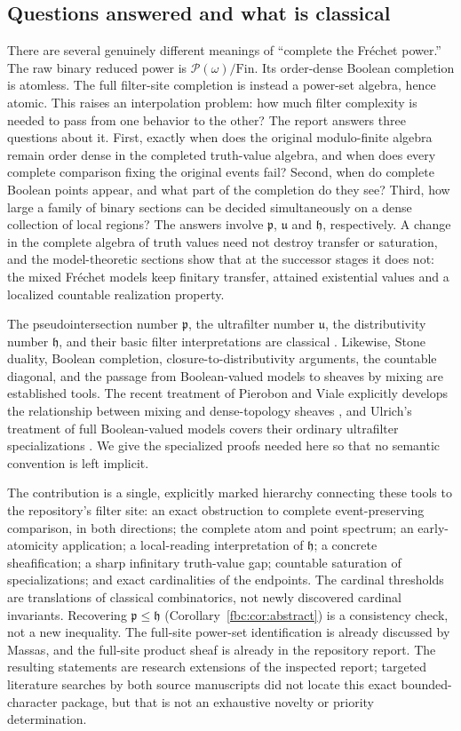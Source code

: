 \documentclass[11pt,letterpaper]{article}
\theoremstyle{definition}
\theoremstyle{remark}
\newcommand{\om}{\omega}
\newcommand{\Fin}{\mathrm{Fin}}
\newcommand{\pow}{\mathcal P}
\newcommand{\cp}{\mathfrak p}
\newcommand{\cu}{\mathfrak u}
\newcommand{\ch}{\mathfrak h}
\begin{document}
\subsection{Questions answered and what is classical}
There are several genuinely different meanings of ``complete the
Fr\'echet power.'' The raw binary reduced power is $\pow(\om)/\Fin$. Its
order-dense Boolean completion is atomless. The full filter-site
completion is instead a power-set algebra, hence atomic. This raises an
interpolation problem: how much filter complexity is needed to pass from
one behavior to the other? The report answers three questions about it.
First, exactly when does the original modulo-finite algebra remain order
dense in the completed truth-value algebra, and when does every complete
comparison fixing the original events fail? Second, when do complete
Boolean points appear, and what part of the completion do they see?
Third, how large a family of binary sections can be decided
simultaneously on a dense collection of local regions? The answers
involve $\cp$, $\cu$ and $\ch$, respectively. A change in the complete
algebra of truth values need not destroy transfer or saturation, and the
model-theoretic sections show that at the successor stages it does not:
the mixed Fr\'echet models keep finitary transfer, attained existential
values and a localized countable realization property.

The pseudointersection number $\cp$, the ultrafilter number $\cu$, the
distributivity number $\ch$, and their basic filter interpretations are
classical \cite{Blass}. Likewise, Stone duality, Boolean completion,
closure-to-distributivity arguments, the countable diagonal, and the
passage from Boolean-valued models to sheaves by mixing are established
tools. The recent treatment of Pierobon and Viale explicitly develops the
relationship between mixing and dense-topology sheaves \cite{PV}, and
Ulrich's treatment of full Boolean-valued models covers their ordinary
ultrafilter specializations \cite[Sections~2--3]{Ulrich}. We give the
specialized proofs needed here so that no semantic convention is left
implicit.

The contribution is a single, explicitly marked hierarchy connecting
these tools to the repository's filter site: an exact obstruction to
complete event-preserving comparison, in both directions; the complete
atom and point spectrum; an early-atomicity application; a local-reading
interpretation of $\ch$; a concrete sheafification; a sharp infinitary
truth-value gap; countable saturation of specializations; and exact
cardinalities of the endpoints. The cardinal thresholds are translations
of classical combinatorics, not newly discovered cardinal invariants.
Recovering $\cp\leq\ch$ (Corollary~\ref{fbc:cor:abstract}) is a
consistency check, not a new inequality. The full-site power-set
identification is already discussed by Massas, and the full-site product
sheaf is already in the repository report. The resulting statements are
research extensions of the inspected report; targeted literature
searches by both source manuscripts did not locate this exact
bounded-character package, but that is not an exhaustive novelty or
priority determination.
\end{document}
